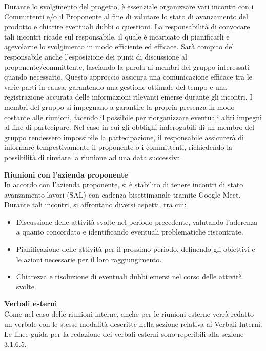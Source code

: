 Durante lo svolgimento del progetto, è essenziale organizzare vari incontri con i Committenti e/o il Proponente al fine di valutare lo stato di avanzamento del prodotto e chiarire eventuali dubbi o questioni.
La responsabilità di convocare tali incontri ricade sul responsabile, il quale è incaricato di pianificarli e agevolarne lo svolgimento in modo efficiente ed efficace.
Sarà compito del responsabile anche l’esposizione dei punti di discussione al proponente/committente, lasciando la parola ai membri del gruppo interessati quando necessario. Questo approccio assicura una comunicazione efficace tra le varie parti in causa, garantendo una gestione ottimale del tempo e una registrazione accurata delle informazioni rilevanti emerse durante gli incontri.
I membri del gruppo si impegnano a garantire la propria presenza in modo costante alle riunioni, facendo il possibile per riorganizzare eventuali altri impegni al fine di partecipare. Nel caso in cui gli obblighi inderogabili di un membro del gruppo rendessero impossibile la partecipazione, il responsabile assicurerà di informare tempestivamente il proponente o i committenti, richiedendo la possibilità di rinviare la riunione ad una data successiva.

\textbf{Riunioni con l'azienda proponente}\\
In accordo con l’azienda proponente, si è stabilito di tenere incontri di stato avanzamento lavori (SAL) con cadenza bisettimanale tramite Google Meet.
Durante tali incontri, si affrontano diversi aspetti, tra cui:
\begin{itemize}
    \item Discussione delle attività svolte nel periodo precedente, valutando l’aderenza a quanto concordato e identificando eventuali problematiche riscontrate.
    \item Pianificazione delle attività per il prossimo periodo, definendo gli obiettivi e le azioni necessarie per il loro raggiungimento.
    \item Chiarezza e risoluzione di eventuali dubbi emersi nel corso delle attività svolte.
\end{itemize}

\textbf{Verbali esterni}\\
Come nel caso delle riunioni interne, anche per le riunioni esterne verrà redatto un verbale con le stesse modalità descritte nella sezione relativa ai Verbali Interni.
Le linee guida per la redazione dei verbali esterni sono reperibili alla sezione 3.1.6.5.


